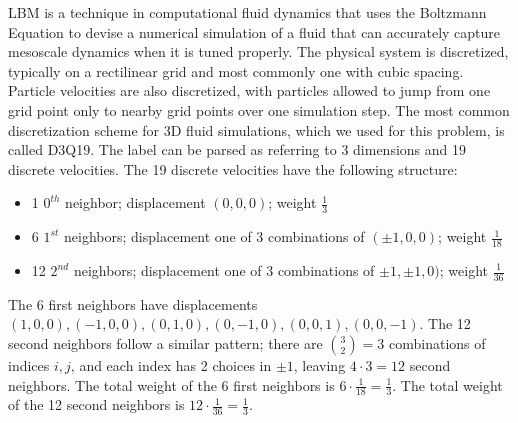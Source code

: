\documentclass[11pt]{article} %
\begin{document}
LBM is a technique in computational fluid dynamics that uses the Boltzmann Equation
to devise a numerical simulation of a fluid that can accurately capture mesoscale dynamics
when it is tuned properly.
The physical system is discretized, typically on a rectilinear grid 
and most commonly one with cubic spacing.  
Particle velocities are also discretized, with particles allowed to jump from one grid point only to nearby grid points over one simulation step.
The most common discretization scheme for 3D fluid simulations,
which we used for this problem, is called D3Q19.
The label can be parsed as referring to 3 dimensions and 19 discrete velocities.
The 19 discrete velocities have the following structure:
\begin{itemize}
\item 1 $0^{th}$ neighbor; displacement $(0,0,0)$; weight $\frac{1}{3}$
\item 6 $1^{st}$ neighbors; displacement one of 3 combinations of $(\pm 1, 0, 0)$; weight $\frac{1}{18}$
\item 12 $2^{nd}$ neighbors; displacement one of 3 combinations of $\pm 1, \pm 1, 0)$; weight $\frac{1}{36}$
\end{itemize}
The 6 first neighbors have displacements $(1,0,0), (-1,0,0), (0,1,0), (0,-1,0), (0,0,1), (0,0,-1)$.
The 12 second neighbors follow a similar pattern; there are ${3 \choose 2} = 3$ combinations of indices
$i, j$, and each index has 2 choices in $\pm1$, leaving $4 \cdot 3 = 12$ second neighbors.
The total weight of the 6 first neighbors is $6 \cdot \frac{1}{18} = \frac{1}{3}$.
The total weight of the 12 second neighbors is $12 \cdot \frac{1}{36} = \frac{1}{3}$.
\end{document}
